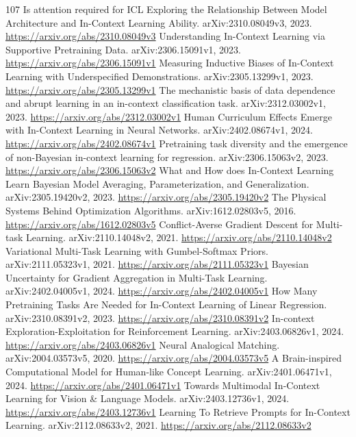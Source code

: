 \documentclass[11pt]{article}
\begin{document}
\begin{thebibliography}{107}
 Is attention required for ICL Exploring the Relationship Between Model Architecture and In-Context Learning Ability. arXiv:2310.08049v3, 2023. \url{https://arxiv.org/abs/2310.08049v3}
 Understanding In-Context Learning via Supportive Pretraining Data. arXiv:2306.15091v1, 2023. \url{https://arxiv.org/abs/2306.15091v1}
 Measuring Inductive Biases of In-Context Learning with Underspecified Demonstrations. arXiv:2305.13299v1, 2023. \url{https://arxiv.org/abs/2305.13299v1}
 The mechanistic basis of data dependence and abrupt learning in an in-context classification task. arXiv:2312.03002v1, 2023. \url{https://arxiv.org/abs/2312.03002v1}
 Human Curriculum Effects Emerge with In-Context Learning in Neural Networks. arXiv:2402.08674v1, 2024. \url{https://arxiv.org/abs/2402.08674v1}
 Pretraining task diversity and the emergence of non-Bayesian in-context learning for regression. arXiv:2306.15063v2, 2023. \url{https://arxiv.org/abs/2306.15063v2}
 What and How does In-Context Learning Learn Bayesian Model Averaging, Parameterization, and Generalization. arXiv:2305.19420v2, 2023. \url{https://arxiv.org/abs/2305.19420v2}
 The Physical Systems Behind Optimization Algorithms. arXiv:1612.02803v5, 2016. \url{https://arxiv.org/abs/1612.02803v5}
 Conflict-Averse Gradient Descent for Multi-task Learning. arXiv:2110.14048v2, 2021. \url{https://arxiv.org/abs/2110.14048v2}
 Variational Multi-Task Learning with Gumbel-Softmax Priors. arXiv:2111.05323v1, 2021. \url{https://arxiv.org/abs/2111.05323v1}
 Bayesian Uncertainty for Gradient Aggregation in Multi-Task Learning. arXiv:2402.04005v1, 2024. \url{https://arxiv.org/abs/2402.04005v1}
 How Many Pretraining Tasks Are Needed for In-Context Learning of Linear Regression. arXiv:2310.08391v2, 2023. \url{https://arxiv.org/abs/2310.08391v2}
 In-context Exploration-Exploitation for Reinforcement Learning. arXiv:2403.06826v1, 2024. \url{https://arxiv.org/abs/2403.06826v1}
 Neural Analogical Matching. arXiv:2004.03573v5, 2020. \url{https://arxiv.org/abs/2004.03573v5}
 A Brain-inspired Computational Model for Human-like Concept Learning. arXiv:2401.06471v1, 2024. \url{https://arxiv.org/abs/2401.06471v1}
 Towards Multimodal In-Context Learning for Vision \& Language Models. arXiv:2403.12736v1, 2024. \url{https://arxiv.org/abs/2403.12736v1}
 Learning To Retrieve Prompts for In-Context Learning. arXiv:2112.08633v2, 2021. \url{https://arxiv.org/abs/2112.08633v2}

\end{thebibliography}
\end{document}
